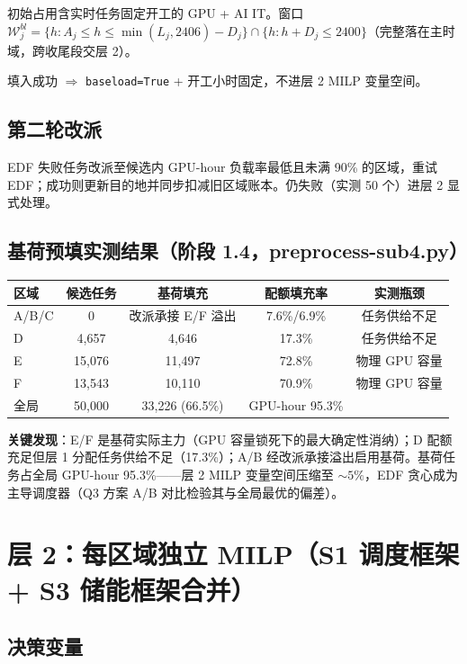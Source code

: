 \documentclass{internal-report}
\begin{document}
初始占用含实时任务固定开工的 GPU + AI IT。窗口 $\mathcal{W}_j^{bl}=\{h: A_j\le h\le \min(L_j,2406)-D_j\}\cap\{h: h+D_j\le 2400\}$（完整落在主时域，跨收尾段交层 2）。

填入成功 $\Rightarrow$ \texttt{baseload=True} + 开工小时固定，不进层 2 MILP 变量空间。

\subsection{第二轮改派}

EDF 失败任务改派至候选内 GPU-hour 负载率最低且未满 90\% 的区域，重试 EDF；成功则更新目的地并同步扣减旧区域账本。仍失败（实测 50 个）进层 2 显式处理。

\subsection{基荷预填实测结果（阶段 1.4，preprocess-sub4.py）}

\begin{center}
\footnotesize
\begin{tabular}{lcccc}
\toprule
区域 & 候选任务 & 基荷填充 & 配额填充率 & 实测瓶颈 \\
\midrule
A/B/C & 0 & 改派承接 E/F 溢出 & 7.6\%/6.9\% & 任务供给不足 \\
D & 4,657 & 4,646 & 17.3\% & 任务供给不足 \\
E & 15,076 & 11,497 & 72.8\% & 物理 GPU 容量 \\
F & 13,543 & 10,110 & 70.9\% & 物理 GPU 容量 \\
\midrule
全局 & 50,000 & 33,226 (66.5\%) & GPU-hour 95.3\% & \\
\bottomrule
\end{tabular}
\end{center}

\textbf{关键发现}：E/F 是基荷实际主力（GPU 容量锁死下的最大确定性消纳）；D 配额充足但层 1 分配任务供给不足（17.3\%）；A/B 经改派承接溢出启用基荷。基荷任务占全局 GPU-hour 95.3\%——层 2 MILP 变量空间压缩至 $\sim 5\%$，EDF 贪心成为主导调度器（Q3 方案 A/B 对比检验其与全局最优的偏差）。

\section{层 2：每区域独立 MILP（S1 调度框架 + S3 储能框架合并）}

\subsection{决策变量}
\end{document}
